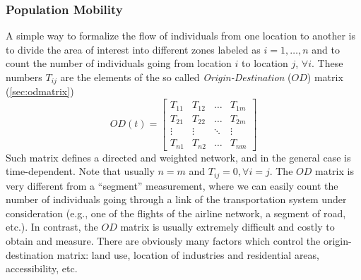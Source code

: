 \subsubsection{Population Mobility}
A simple way to formalize the flow of individuals from one location to another is to divide the area of interest into different zones labeled as $i = 1, \dots, n$ and to count the number of individuals going from location $i$ to location $j$, $\forall i$. These numbers $T_{ij}$ are the elements of the so called \emph{Origin-Destination} ($OD$) matrix (\sectionname\ref{sec:odmatrix})
\begin{equation}
OD(t) = 
\begin{bmatrix}
    T_{11} & T_{12} & \dots  & T_{1m} \\
    T_{21} & T_{22} & \dots  & T_{2m} \\
    \vdots & \vdots & \ddots & \vdots \\
    T_{n1} & T_{n2} & \dots  & T_{nm}
\end{bmatrix}
\end{equation}
Such matrix defines a directed and weighted network, and in the general case is time-dependent. Note that usually $n = m$ and $T_{ij} = 0, \forall i = j$.
The $OD$ matrix is very different from a ``segment'' measurement, where we can easily count the number of individuals going through a link of the transportation system under consideration (e.g., one of the flights of the airline network, a segment of road, etc.). In contrast, the $OD$ matrix is usually extremely difficult and costly to obtain and measure. There are obviously many factors which control the origin-destination matrix: land use, location of industries and residential areas, accessibility, etc.

